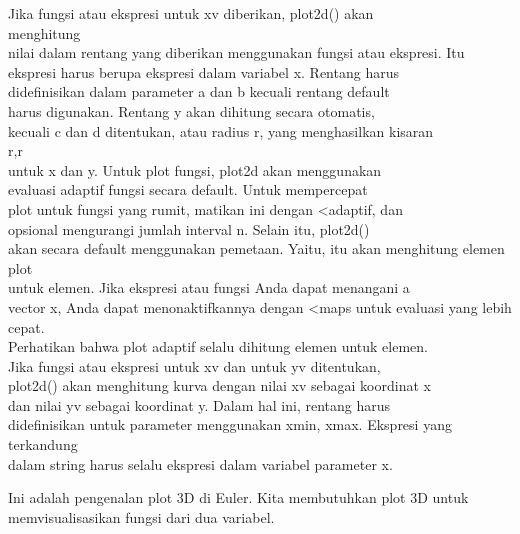 \documentclass[a4paper,10pt]{article}
\begin{document}
\begin{eulernotebook}
\begin{eulercomment}
\begin{eulercomment}
\begin{eulercomment}
\begin{eulercomment}
\begin{eulercomment}
\begin{eulercomment}
\begin{eulercomment}
\begin{eulercomment}
\begin{eulercomment}
\begin{eulercomment}
\begin{eulercomment}
Jika fungsi atau ekspresi untuk xv diberikan, plot2d() akan\\
menghitung\\
nilai dalam rentang yang diberikan menggunakan fungsi atau ekspresi.
Itu\\
ekspresi harus berupa ekspresi dalam variabel x. Rentang harus\\
didefinisikan dalam parameter a dan b kecuali rentang default\\
harus digunakan. Rentang y akan dihitung secara otomatis,\\
kecuali c dan d ditentukan, atau radius r, yang menghasilkan kisaran\\
r,r\\
untuk x dan y. Untuk plot fungsi, plot2d akan menggunakan\\
evaluasi adaptif fungsi secara default. Untuk mempercepat\\
plot untuk fungsi yang rumit, matikan ini dengan \textless{}adaptif, dan\\
opsional mengurangi jumlah interval n. Selain itu, plot2d()\\
akan secara default menggunakan pemetaan. Yaitu, itu akan menghitung
elemen plot\\
untuk elemen. Jika ekspresi atau fungsi Anda dapat menangani a\\
vector x, Anda dapat menonaktifkannya dengan \textless{}maps untuk evaluasi yang
lebih cepat.\\
Perhatikan bahwa plot adaptif selalu dihitung elemen untuk elemen.\\
Jika fungsi atau ekspresi untuk xv dan untuk yv ditentukan,\\
plot2d() akan menghitung kurva dengan nilai xv sebagai koordinat x\\
dan nilai yv sebagai koordinat y. Dalam hal ini, rentang harus\\
didefinisikan untuk parameter menggunakan xmin, xmax. Ekspresi yang
terkandung\\
dalam string harus selalu ekspresi dalam variabel parameter x.
\end{eulercomment}
\begin{eulercomment}


\begin{eulercomment}
\begin{eulercomment}
Ini adalah pengenalan plot 3D di Euler. Kita membutuhkan plot 3D untuk
memvisualisasikan fungsi dari dua variabel.


\end{eulercomment}
\end{eulercomment}
\end{eulercomment}
\end{eulercomment}
\end{eulercomment}
\end{eulercomment}
\end{eulercomment}
\end{eulercomment}
\end{eulercomment}
\end{eulercomment}
\end{eulercomment}
\end{eulercomment}
\end{eulercomment}
\end{eulernotebook}
\end{document}
